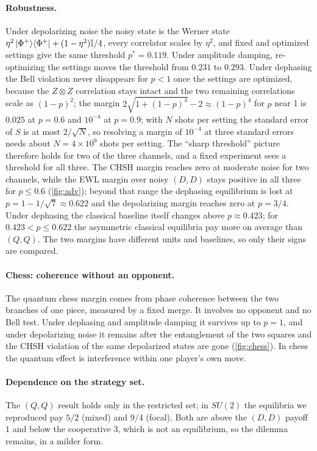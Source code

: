 \documentclass[11pt,a4paper]{article}
\begin{document}
\paragraph{Robustness.} Under depolarizing noise the noisy state is the Werner state $\eta^2\ket{\Phi^+}\!\bra{\Phi^+}+(1-\eta^2)\mathbb I/4$, every correlator scales by $\eta^2$, and fixed and optimized settings give the same threshold $p^*=0.119$. Under amplitude damping, re-optimizing the settings moves the threshold from $0.231$ to $0.293$. Under dephasing the Bell violation never disappears for $p<1$ once the settings are optimized, because the $Z\otimes Z$ correlation stays intact and the two remaining correlations scale as $(1-p)^2$; the margin $2\sqrt{1+(1-p)^4}-2\approx(1-p)^4$ for $p$ near 1 is $0.025$ at $p=0.6$ and $10^{-4}$ at $p=0.9$; with $N$ shots per setting the standard error of $S$ is at most $2/\sqrt N$, so resolving a margin of $10^{-4}$ at three standard errors needs about $N=4\times10^{9}$ shots per setting. The ``sharp threshold'' picture therefore holds for two of the three channels, and a fixed experiment sees a threshold for all three. The CHSH margin reaches zero at moderate noise for two channels, while the EWL margin over noisy $(D,D)$ stays positive in all three for $p\le0.6$ (\cref{fig:adv}); beyond that range the dephasing equilibrium is lost at $p=1-1/\sqrt7\approx0.622$ and the depolarizing margin reaches zero at $p=3/4$. Under dephasing the classical baseline itself changes above $p\approx0.423$; for $0.423<p\le0.622$ the asymmetric classical equilibria pay more on average than $(Q,Q)$. The two margins have different units and baselines, so only their signs are compared.

\paragraph{Chess: coherence without an opponent.} The quantum chess margin comes from phase coherence between the two branches of one piece, measured by a fixed merge. It involves no opponent and no Bell test. Under dephasing and amplitude damping it survives up to $p=1$, and under depolarizing noise it remains after the entanglement of the two squares and the CHSH violation of the same depolarized states are gone (\cref{fig:chess}). In chess the quantum effect is interference within one player's own move.

\paragraph{Dependence on the strategy set.} The $(Q,Q)$ result holds only in the restricted set; in $SU(2)$ the equilibria we reproduced pay $5/2$ (mixed) and $9/4$ (focal). Both are above the $(D,D)$ payoff $1$ and below the cooperative $3$, which is not an equilibrium, so the dilemma remains, in a milder form.
\end{document}
